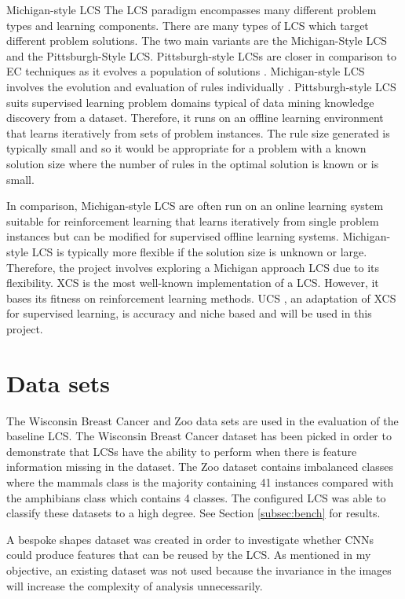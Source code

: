 Michigan-style LCS \label{subsec:mich}
The LCS paradigm encompasses many different problem types and learning components. There are many types of LCS which target different problem solutions. The two main variants are the Michigan-Style LCS and the Pittsburgh-Style LCS. Pittsburgh-style LCSs are closer in comparison to EC techniques as it evolves a population of solutions \cite{butz2010learning}. Michigan-style LCS involves the evolution and evaluation of rules individually \cite{butz2010learning}. Pittsburgh-style LCS suits supervised learning problem domains typical of data mining knowledge discovery from a dataset. Therefore, it runs on an offline learning environment that learns iteratively from sets of problem instances. The rule size generated is typically small and so it would be appropriate for a problem with a known solution size where the number of rules in the optimal solution is known or is small. 

In comparison, Michigan-style LCS are often run on an online learning system suitable for reinforcement learning that learns iteratively from single problem instances but can be modified for supervised offline learning systems. Michigan-style LCS is typically more flexible if the solution size is unknown or large. Therefore, the project involves exploring a Michigan approach LCS due to its flexibility. XCS is the most well-known implementation of a LCS. However, it bases its fitness on reinforcement learning methods. UCS \cite{urbanowicz2017introduction}, an adaptation of XCS for supervised learning, is accuracy and niche based and will be used in this project. 

\section{Data sets} \label{subsec:datasets}
The Wisconsin Breast Cancer \cite{wisconsinbreast} and Zoo \cite{zoodata} data sets are used in the evaluation of the baseline LCS. The Wisconsin Breast Cancer dataset has been picked in order to demonstrate that LCSs have the ability to perform when there is feature information missing in the dataset. The Zoo dataset contains imbalanced classes where the mammals class is the majority containing 41 instances compared with the amphibians class which contains 4 classes. The configured LCS was able to classify these datasets to a high degree. See Section \ref{subsec:bench} for results. 

A bespoke shapes dataset was created in order to investigate whether CNNs could produce features that can be reused by the LCS. As mentioned in my objective, an existing dataset was not used because the invariance in the images will increase the complexity of analysis unnecessarily. 

